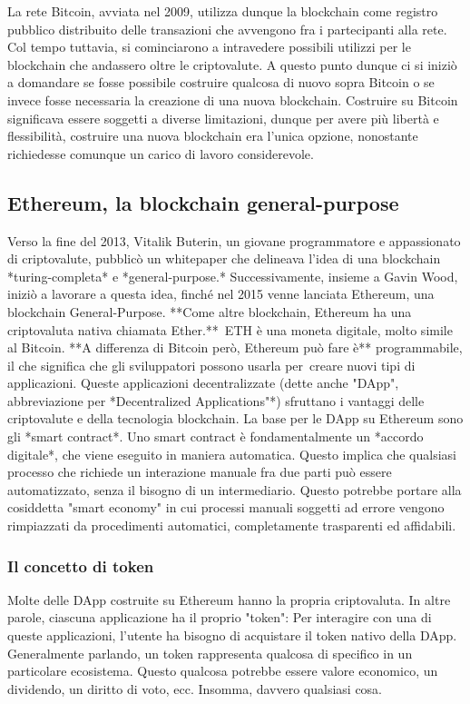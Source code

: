 La rete Bitcoin, avviata nel 2009, utilizza dunque la blockchain come registro pubblico distribuito delle transazioni che avvengono fra i partecipanti alla rete. Col tempo tuttavia, si cominciarono a intravedere possibili utilizzi per le blockchain che andassero oltre le criptovalute. A questo punto dunque ci si iniziò a domandare se fosse possibile costruire qualcosa di nuovo sopra Bitcoin o se invece fosse necessaria la creazione di una nuova blockchain. Costruire su Bitcoin significava essere soggetti a diverse limitazioni, dunque per avere più libertà e flessibilità, costruire una nuova blockchain era l'unica opzione, nonostante richiedesse comunque un carico di lavoro considerevole.

\subsection{Ethereum, la blockchain general-purpose}

Verso la fine del 2013, Vitalik Buterin, un giovane programmatore e appassionato di criptovalute, pubblicò un whitepaper che delineava l'idea di una blockchain *turing-completa* e *general-purpose.* Successivamente, insieme a Gavin Wood, iniziò a lavorare a questa idea, finché nel 2015 venne lanciata Ethereum, una blockchain General-Purpose. **Come altre blockchain, Ethereum ha una criptovaluta nativa chiamata Ether.** ETH è una moneta digitale, molto simile al Bitcoin. **A differenza di Bitcoin però, Ethereum può fare è** programmabile, il che significa che gli sviluppatori possono usarla per creare nuovi tipi di applicazioni. Queste applicazioni decentralizzate (dette anche "DApp", abbreviazione per *Decentralized Applications"*) sfruttano i vantaggi delle criptovalute e della tecnologia blockchain. 
La base per le DApp su Ethereum sono gli *smart contract*. Uno smart contract è fondamentalmente un *accordo digitale*, che viene eseguito in maniera automatica. Questo implica che qualsiasi processo che richiede un interazione manuale fra due parti può essere automatizzato, senza il bisogno di un intermediario. Questo potrebbe portare alla cosiddetta "smart economy" in cui processi manuali soggetti ad errore vengono rimpiazzati da procedimenti automatici, completamente trasparenti ed affidabili. 

\subsubsection{Il concetto di token}

Molte delle DApp costruite su Ethereum hanno la propria criptovaluta. In altre parole, ciascuna applicazione ha il proprio "token": Per interagire con una di queste applicazioni, l'utente ha bisogno di acquistare il token nativo della DApp. Generalmente parlando, un token rappresenta qualcosa di specifico in un particolare ecosistema. Questo qualcosa potrebbe essere valore economico, un dividendo, un diritto di voto, ecc. Insomma, davvero qualsiasi cosa.

